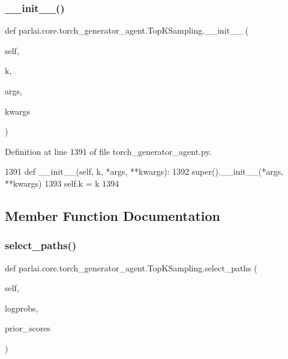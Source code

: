 \subsubsection{\texorpdfstring{\+\_\+\+\_\+init\+\_\+\+\_\+()}{\_\_init\_\_()}}
{\footnotesize\ttfamily def parlai.\+core.\+torch\+\_\+generator\+\_\+agent.\+Top\+K\+Sampling.\+\_\+\+\_\+init\+\_\+\+\_\+ (\begin{DoxyParamCaption}\item[{}]{self,  }\item[{}]{k,  }\item[{}]{args,  }\item[{}]{kwargs }\end{DoxyParamCaption})}



Definition at line 1391 of file torch\+\_\+generator\+\_\+agent.\+py.


\begin{DoxyCode}
1391     \textcolor{keyword}{def }\_\_init\_\_(self, k, *args, **kwargs):
1392         super().\_\_init\_\_(*args, **kwargs)
1393         self.k = k
1394 
\end{DoxyCode}


\subsection{Member Function Documentation}
\mbox{\label{classparlai_1_1core_1_1torch__generator__agent_1_1TopKSampling_a3ca83b8ee8aff13c05afbb973f948b6f}} 
\subsubsection{\texorpdfstring{select\+\_\+paths()}{select\_paths()}}
{\footnotesize\ttfamily def parlai.\+core.\+torch\+\_\+generator\+\_\+agent.\+Top\+K\+Sampling.\+select\+\_\+paths (\begin{DoxyParamCaption}\item[{}]{self,  }\item[{}]{logprobs,  }\item[{}]{prior\+\_\+scores }\end{DoxyParamCaption})}



